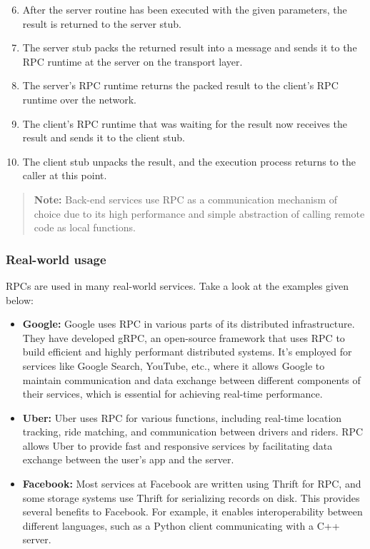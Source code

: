 \begin{enumerate}
\setcounter{enumi}{5}
\item
{}\label{ZkMOeso2xfDX4wBvC_sM1}
After the server routine has been executed with the given parameters, the result is returned to the server stub.
\item
{}\label{UaYRypwZMII_rUFTBgTUQ}
The server stub packs the returned result into a message and sends it to the RPC runtime at the server on the transport layer.
\item
{}\label{ghHcdhdUeGxYn4Ti2jGHw}
The server's RPC runtime returns the packed result to the client's RPC runtime over the network.
\item
{}\label{HQ_aijTDQe7w5VUC9xoPf}
The client's RPC runtime that was waiting for the result now receives the result and sends it to the client stub.
\item
{}\label{vi60CUC9NzNv5lhktCVtO}
The client stub unpacks the result, and the execution process returns to the caller at this point.
\end{enumerate}
\begin{quote}
\textbf{Note:} Back-end services use RPC as a communication mechanism of choice due to its high performance and simple abstraction of calling remote code as local functions.
\end{quote}
\subsubsection{Real-world usage}\label{l5Gd_jSOQ_k5FTxkBvBup}

RPCs are used in many real-world services. Take a look at the examples given below:

\begin{itemize}
\item
{}\label{7FnVPQSX2do4wtAumy6MX}
\textbf{Google:} Google uses RPC in various parts of its distributed infrastructure. They have developed gRPC, an open-source framework that uses RPC to build efficient and highly performant distributed systems. It's employed for services like Google Search, YouTube, etc., where it allows Google to maintain communication and data exchange between different components of their services, which is essential for achieving real-time performance.
\item
{}\label{hHrzLIUTUx9kgbj8ZZJnc}
\textbf{Uber:} Uber uses RPC for various functions, including real-time location tracking, ride matching, and communication between drivers and riders. RPC allows Uber to provide fast and responsive services by facilitating data exchange between the user's app and the server.
\item
{}\label{Xn_EcIZp2s9G1DABTpR5t}
\textbf{Facebook:} Most services at Facebook are written using Thrift for RPC, and some storage systems use Thrift for serializing records on disk. This provides several benefits to Facebook. For example, it enables interoperability between different languages, such as a Python client communicating with a C++ server.
\end{itemize}

